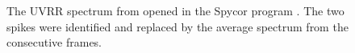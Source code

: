 \begin{figure}
	\centering
	\vspace{3mm}
	\caption[%
		Spycor - program for spike removal.
	]{%
		The UVRR spectrum from  opened in the
		Spycor program
		\parencite{Spycor2018}.
		The two spikes were identified and replaced by the average spectrum
		from the consecutive frames.
	}
	\label{\figlabel{cosmic_spikes:spycor}}
\end{figure}

